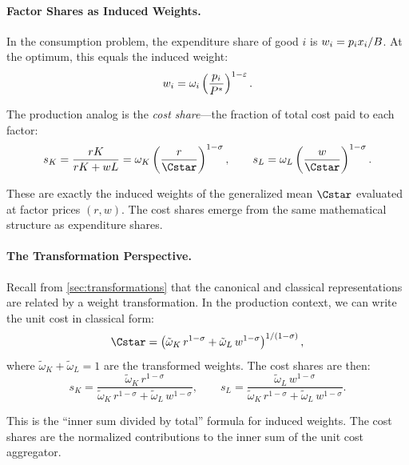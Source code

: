 \paragraph{Factor Shares as Induced Weights.}
In the consumption problem, the expenditure share of good $i$ is $w_i = p_i x_i / B$. At the optimum, this equals the induced weight:
\begin{equation}
w_i = \omega_i \left( \frac{p_i}{P^{*}} \right)^{1-\varepsilon}.
\label{eq:exp-share-recall}
\end{equation}

The production analog is the \emph{cost share}---the fraction of total cost paid to each factor:
\begin{equation}
s_K = \frac{rK}{rK + wL} = \omega_K \left( \frac{r}{\Cstar} \right)^{1-\sigma}, \qquad s_L = \omega_L \left( \frac{w}{\Cstar} \right)^{1-\sigma}.
\label{eq:cost-share-induced}
\end{equation}

These are exactly the induced weights of the generalized mean $\Cstar$ evaluated at factor prices $(r, w)$. The cost shares emerge from the same mathematical structure as expenditure shares.

\paragraph{The Transformation Perspective.}
Recall from \cref{sec:transformations} that the canonical and classical representations are related by a weight transformation. In the production context, we can write the unit cost in classical form:
\begin{equation}
\Cstar = \left( \tilde{\omega}_K \, r^{1-\sigma} + \tilde{\omega}_L \, w^{1-\sigma} \right)^{1/(1-\sigma)},
\label{eq:unit-cost-classical}
\end{equation}
where $\tilde{\omega}_K + \tilde{\omega}_L = 1$ are the transformed weights. The cost shares are then:
\begin{equation}
s_K = \frac{\tilde{\omega}_K \, r^{1-\sigma}}{\tilde{\omega}_K \, r^{1-\sigma} + \tilde{\omega}_L \, w^{1-\sigma}}, \qquad s_L = \frac{\tilde{\omega}_L \, w^{1-\sigma}}{\tilde{\omega}_K \, r^{1-\sigma} + \tilde{\omega}_L \, w^{1-\sigma}}.
\label{eq:shares-classical}
\end{equation}

This is the ``inner sum divided by total'' formula for induced weights. The cost shares are the normalized contributions to the inner sum of the unit cost aggregator.

